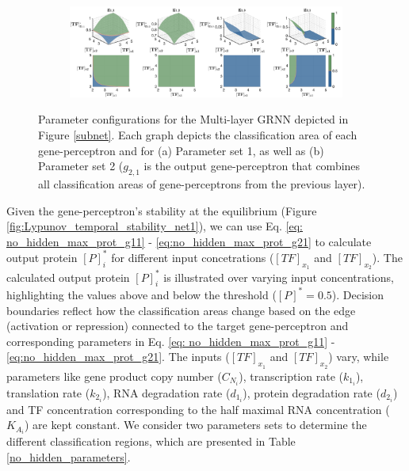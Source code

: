 \documentclass[twocolumn]{biophys-new}
\begin{document}
{{\begin{figure}[ht!]
\begin{subfigure}{0.8\textwidth}
    \includegraphics[width=\textwidth]{figures/para_set-3.pdf}
    \caption{}
    \label{fig:full_net_para_config_2}
\end{subfigure}

\vspace{-0.5em}
\caption{Parameter configurations for the Multi-layer GRNN depicted in Figure \ref{subnet}. Each graph depicts the classification area of each gene-perceptron and for (a) Parameter set 1, as well as (b) Parameter set 2 ($g_{2,1}$ is the output gene-perceptron that combines all classification areas of gene-perceptrons from the previous layer). \vspace{-0.5em}}
\label{fig:full_net_para_config}

\end{figure}

Given the gene-perceptron's stability at the equilibrium (Figure \ref{fig:Lypunov_temporal_stability_net1}),  we can use Eq. \ref{eq: no_hidden_max_prot_g11} - \ref{eq:no_hidden_max_prot_g21}  to calculate output protein $[P]_i^*$ for different input concetrations ($[TF]_{x_1}$ and $[TF]_{x_2}$). The calculated output protein $[P]_i^*$ is illustrated over varying input concentrations, highlighting the values above and below the threshold ($[P]^*=0.5$).
Decision boundaries reflect how the classification areas change based on the edge (activation or repression) connected to the target gene-perceptron and corresponding parameters in  Eq. \ref{eq: no_hidden_max_prot_g11} - \ref{eq:no_hidden_max_prot_g21}. 
The inputs ($[TF]_{x_1}$ and $[TF]_{x_2}$) vary, while parameters like gene product copy number ($C_{N_i}$), transcription rate ($k_{1_i}$), translation rate ($k_{2_i}$), RNA degradation rate ($d_{1_i}$), protein degradation rate ($d_{2_i}$) and TF concentration corresponding to the half maximal RNA concentration ($K_{A_i}$) are kept constant. %
We consider two  parameters sets to determine the different classification regions, which are presented in Table \ref{no_hidden_parameters}.  

}}
\end{document}
